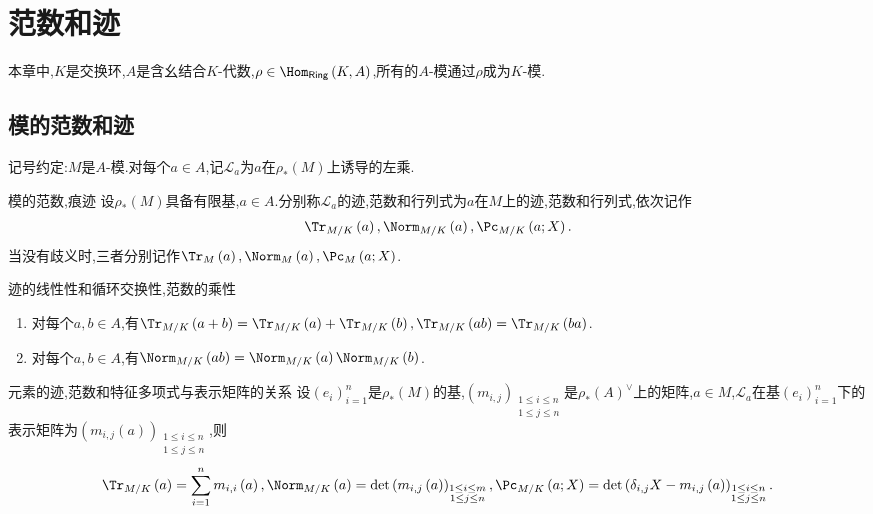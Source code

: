 \chapter{范数和迹}

本章中,$K$是交换环,$A$是含幺结合$K$-代数,$\rho\in\Hom_{\mathsf{Ring}}\left(K,A\right)$,所有的$A$-模通过$\rho$成为$K$-模.

\section{模的范数和迹}

记号约定:$M$是$A$-模.对每个$a\in A$,记$\mathcal{L}_{a}$为$a$在$\rho_{\ast}\left(M\right)$上诱导的左乘.

\begin{definition}{模的范数,痕迹}{}
	设$\rho_{\ast}\left(M\right)$具备有限基,$a\in A$.分别称$\mathcal{L}_{a}$的迹,范数和行列式为$a$在$M$上的迹,范数和行列式,依次记作
	\begin{align*}
		\Tr_{M/K}\left(a\right),\Norm_{M/K}\left(a\right),\Pc_{M/K}\left(a;X\right).
	\end{align*}
	当没有歧义时,三者分别记作$\Tr_{M}\left(a\right),\Norm_{M}\left(a\right),\Pc_{M}\left(a;X\right)$.
\end{definition}

\begin{proposition}{迹的线性性和循环交换性,范数的乘性}{}
	\begin{enumerate}
		\item 对每个$a,b\in A$,有$\Tr_{M/K}\left(a+b\right)=\Tr_{M/K}\left(a\right)+\Tr_{M/K}\left(b\right),\Tr_{M/K}\left(ab\right)=\Tr_{M/K}\left(ba\right)$.
		\item 对每个$a,b\in A$,有$\Norm_{M/K}\left(ab\right)=\Norm_{M/K}\left(a\right)\Norm_{M/K}\left(b\right)$.
	\end{enumerate}
\end{proposition}

\begin{proposition}{元素的迹,范数和特征多项式与表示矩阵的关系}{}
	设$\left(e_{i}\right)_{i=1}^{n}$是$\rho_{\ast}\left(M\right)$的基,$\left(m_{i,j}\right)_{\substack{1\leq i\leq n\\1\leq j\leq n}}$是$\rho_{\ast}\left(A\right)^{\vee}$上的矩阵,$a\in M$,$\mathcal{L}_{a}$在基$\left(e_{i}\right)_{i=1}^{n}$下的表示矩阵为$\left(m_{i,j}\left(a\right)\right)_{\substack{1\leq i\leq n\\1\leq j\leq n}}$,则
	\begin{align*}
		\Tr_{M/K}\left(a\right)=\sum\limits_{i=1}^{n}m_{i,i}\left(a\right),\Norm_{M/K}\left(a\right)=\det\left(m_{i,j}\left(a\right)\right)_{\substack{1\leq i\leq m\\1\leq j\leq n}},\Pc_{M/K}\left(a;X\right)=\det\left(\delta_{i,j}X-m_{i,j}\left(a\right)\right)_{\substack{1\leq i\leq n\\1\leq j\leq n}}.
	\end{align*}
\end{proposition}

